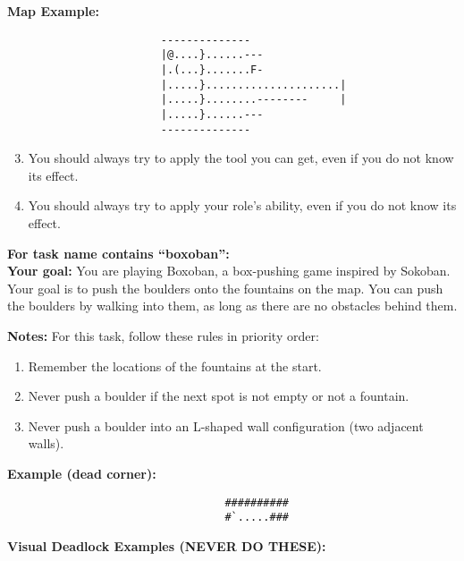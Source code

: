 \begin{MyGreenBox}
	\textbf{Map Example:} \begin{verbatim}
                        --------------
                        |@....}......---
                        |.(...}.......F-
                        |.....}.....................|
                        |.....}........--------     |
                        |.....}......---
                        --------------
\end{verbatim}

	\begin{enumerate}
		\setcounter{enumi}{2}

		\item You should always try to apply the tool you can get, even if you do
			not know its effect.

		\item You should always try to apply your role’s ability, even if you do not
			know its effect.
	\end{enumerate}

	\textbf{For task name contains “boxoban”:}\\ \textbf{Your goal:} You are
	playing Boxoban, a box-pushing game inspired by Sokoban. Your goal is to push
	the boulders onto the fountains on the map. You can push the boulders by walking
	into them, as long as there are no obstacles behind them.

	\textbf{Notes:} For this task, follow these rules in priority order:
	\begin{enumerate}
		\item Remember the locations of the fountains at the start.

		\item Never push a boulder if the next spot is not empty or not a fountain.

		\item Never push a boulder into an L-shaped wall configuration (two adjacent
			walls).
	\end{enumerate}

	\textbf{Example (dead corner):} \begin{verbatim}
                                  ##########
                                  #`.....###
\end{verbatim}

	\textbf{Visual Deadlock Examples (NEVER DO THESE):}


\end{MyGreenBox}
